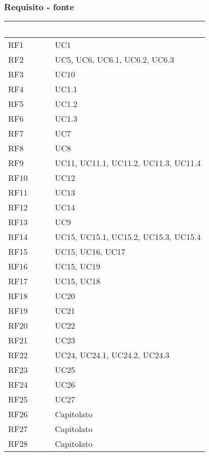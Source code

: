 \subsubsection{Requisito - fonte}
{
      \setlength{\freewidth}{\dimexpr\textwidth-0\tabcolsep}
      \renewcommand{\arraystretch}{1.5}
      \centering
      \setlength{\aboverulesep}{0pt}
      \setlength{\belowrulesep}{0pt}
      \begin{longtable}{C{.47\freewidth} C{.47\freewidth}}
         \toprule
      \textcolor{white}{\textbf{Requisito}}&
      \textcolor{white}{\textbf{Fonti}}\\
      \toprule
      \endhead
      
      RF1 & UC1\\
      RF2 & UC5, UC6, UC6.1, UC6.2, UC6.3\\
      RF3 & UC10\\
      RF4 & UC1.1\\
      RF5 & UC1.2\\
      RF6 & UC1.3\\
      RF7 & UC7\\
      RF8 & UC8\\
      RF9 & UC11, UC11.1, UC11.2, UC11.3, UC11.4\\
      RF10 & UC12\\
      RF11 & UC13\\
      RF12 & UC14\\
      RF13 & UC9\\
      RF14 & UC15, UC15.1, UC15.2, UC15.3, UC15.4\\
      RF15 & UC15, UC16, UC17 \\
      RF16 & UC15, UC19\\
      RF17 & UC15, UC18 \\
      RF18 & UC20\\
      RF19 & UC21\\
      RF20 & UC22\\
      RF21 & UC23\\
      RF22 & UC24, UC24.1, UC24.2, UC24.3\\
      RF23 & UC25\\
      RF24 & UC26\\
      RF25 & UC27\\
      RF26 & Capitolato\\
      RF27 & Capitolato\\
      RF28 & Capitolato\\

\end{longtable}}

